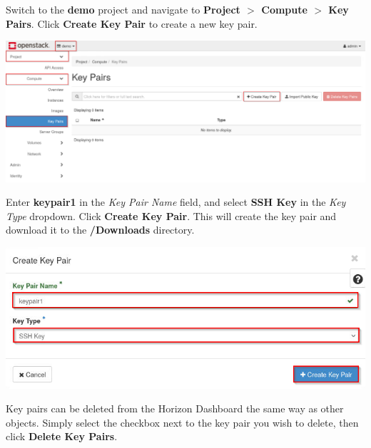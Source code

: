 \documentclass[letterpaper, 12pt]{article}
\begin{document}
\begin{enumerate}
    \begin{labstep}
        Switch to the \textbf{demo} project and navigate to \textbf{Project $>$ Compute $>$ Key Pairs}.
        Click \textbf{Create Key Pair} to create a new key pair.

        \begin{center}
            \includegraphics[width=\linewidth]{images/part4/step2.png}
        \end{center}
    \end{labstep}

    \begin{labstep}
        Enter \textbf{keypair1} in the \textit{Key Pair Name} field, and select \textbf{SSH Key} in the \textit{Key Type} dropdown.
        Click \textbf{Create Key Pair}.
        This will create the key pair and download it to the \textbf{\texttildemid/Downloads} directory.

        \begin{center}
            \includegraphics[width=\linewidth]{images/part4/step3.png}
        \end{center}
    \end{labstep}

    \begin{tipbox}
        Key pairs can be deleted from the Horizon Dashboard the same way as other objects.
        Simply select the checkbox next to the key pair you wish to delete, then click \textbf{Delete Key Pairs}.
    \end{tipbox}


\end{enumerate}
\end{document}
